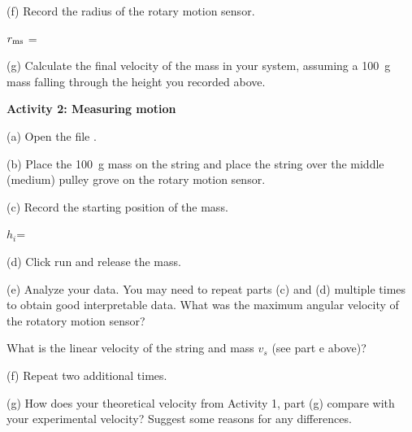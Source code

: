 (f) Record the radius of the rotary motion sensor.

\hspace{0.5in}$r_{\rm ms}$ =
\answerspace{3mm}

(g) Calculate the final velocity of the mass in your system, assuming a 100~g mass falling through the height you recorded above.
\answerspace{20mm}

\pagebreak

\textbf{Activity 2: Measuring motion}  

(a) Open the file . 

(b) Place the 100~g mass on the string and place the string over the middle (medium) pulley grove on the rotary motion sensor. 

(c) Record the starting position of the mass.
\answerspace{5mm}

\hspace{0.5in}$h_{i}$=
\answerspace{5mm}

(d) Click run and release the mass.

(e) Analyze your data. You may need to repeat parts (c) and (d) multiple times to obtain good interpretable data.
What was the maximum angular velocity of the rotatory motion sensor?
\answerspace{20mm} 

What is the linear velocity of the string and mass $v_{s}$ (see part e above)?
\answerspace{10mm} 

(f) Repeat two additional times.
\answerspace{20mm} 

(g) How does your theoretical velocity from Activity 1, part (g) compare with your experimental velocity?  Suggest some reasons for any differences.

